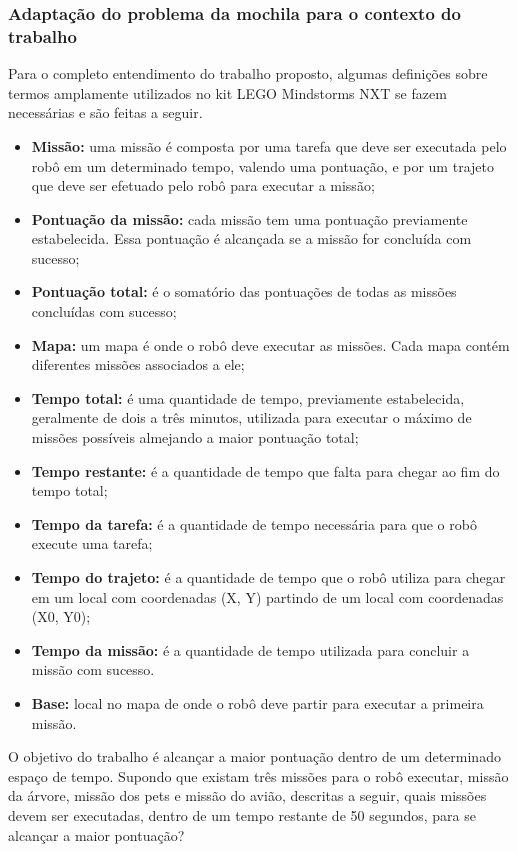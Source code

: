 \subsubsection{Adaptação do problema da mochila para o contexto do trabalho}
Para o completo entendimento do trabalho proposto, algumas definições sobre termos amplamente utilizados no kit LEGO Mindstorms NXT se fazem necessárias e são feitas a seguir.
\begin{itemize}
\item \textbf{Missão:} uma missão é composta por uma tarefa que deve ser executada pelo robô em um determinado tempo, valendo uma pontuação, e por um trajeto que deve ser efetuado pelo robô para executar a missão;
\item \textbf{Pontuação da missão:} cada missão tem uma pontuação previamente estabelecida. Essa pontuação é alcançada se a missão for concluída com sucesso;
\item \textbf{Pontuação total:} é o somatório das pontuações de todas as missões concluídas com sucesso;
\item \textbf{Mapa:} um mapa é onde o robô deve executar as missões. Cada mapa contém diferentes missões associados a ele;
\item \textbf{Tempo total:} é uma quantidade de tempo, previamente estabelecida, geralmente de dois a três minutos, utilizada para executar o máximo de missões possíveis almejando a maior pontuação total;
\item \textbf{Tempo restante:} é a quantidade de tempo que falta para chegar ao fim do tempo total;
\item \textbf{Tempo da tarefa:}  é a quantidade de tempo necessária para que o robô execute uma tarefa;
\item \textbf{Tempo do trajeto:} é a quantidade de tempo que o robô utiliza para chegar em um local com coordenadas (X, Y) partindo de um local com coordenadas (X0, Y0);
\item \textbf{Tempo da missão:} é a quantidade de tempo utilizada para concluir a missão com sucesso.
\item \textbf{Base:} local no mapa de onde o robô deve partir para executar a primeira missão. 
\end{itemize}

O objetivo do trabalho é alcançar a maior pontuação dentro de um determinado espaço de tempo. Supondo que existam três missões para o robô executar, missão da árvore, missão dos pets e missão do avião, descritas a seguir, quais missões devem ser executadas, dentro de um tempo restante de 50 segundos, para se alcançar a maior pontuação?

